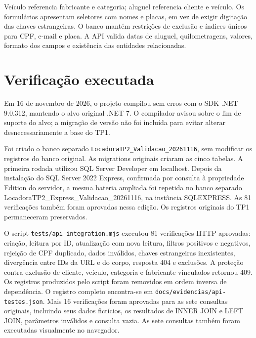 \documentclass[12pt]{article}
\begin{document}
Veículo referencia fabricante e categoria; aluguel referencia cliente e veículo. Os formulários apresentam seletores com nomes e placas, em vez de exigir digitação das chaves estrangeiras. O banco mantém restrições de exclusão e índices únicos para CPF, e-mail e placa. A API valida datas de aluguel, quilometragens, valores, formato dos campos e existência das entidades relacionadas.
\section{Verificação executada}
Em 16 de novembro de 2026, o projeto compilou sem erros com o SDK .NET 9.0.312, mantendo o alvo original .NET 7. O compilador avisou sobre o fim de suporte do alvo; a migração de versão não foi incluída para evitar alterar desnecessariamente a base do TP1.

Foi criado o banco separado \texttt{LocadoraTP2\_Validacao\_20261116}, sem modificar os registros do banco original. As migrations originais criaram as cinco tabelas. A primeira rodada utilizou SQL Server Developer em localhost. Depois da instalação do SQL Server 2022 Express, confirmada por consulta à propriedade Edition do servidor, a mesma bateria ampliada foi repetida no banco separado LocadoraTP2\_Express\_Validacao\_20261116, na instância SQLEXPRESS. As 81 verificações também foram aprovadas nessa edição. Os registros originais do TP1 permaneceram preservados.

O script \texttt{tests/api-integration.mjs} executou 81 verificações HTTP aprovadas: criação, leitura por ID, atualização com nova leitura, filtros positivos e negativos, rejeição de CPF duplicado, dados inválidos, chaves estrangeiras inexistentes, divergência entre IDs da URL e do corpo, resposta 404 e exclusões. A proteção contra exclusão de cliente, veículo, categoria e fabricante vinculados retornou 409. Os registros produzidos pelo script foram removidos em ordem inversa de dependência. O registro completo encontra-se em \texttt{docs/evidencias/api-testes.json}. Mais 16 verificações foram aprovadas para as sete consultas originais, incluindo seus dados fictícios, os resultados de INNER JOIN e LEFT JOIN, parâmetros inválidos e consulta vazia. As sete consultas também foram executadas visualmente no navegador.
\end{document}
